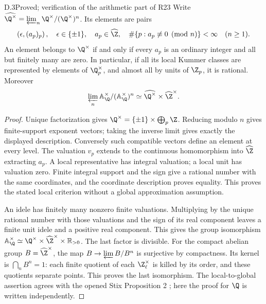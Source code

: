 \begin{claim}{D.3}{Proved; verification of the arithmetic part of R23}
Write $\widehat{\Q^\times}=\varprojlim_n\Q^\times/(\Q^\times)^n$.
Its elements are pairs
\[
 \left(\epsilon,(a_p)_p\right),\quad
 \epsilon\in\{\pm1\},\quad a_p\in\widehat{\Z},
 \quad\#\{p:a_p\not\equiv0\pmod n\}<\infty\quad(n\geq1).
\]
An element belongs to $\Q^\times$ if and only if every $a_p$ is an
ordinary integer and all but finitely many are zero. In particular,
if all its local Kummer classes are represented by elements of
$\Q_p^\times$, and almost all by units of $\Z_p$, it is rational.
Moreover
\[
 \varprojlim_n\mathbb A_\Q^\times/(\mathbb A_\Q^\times)^n
       \simeq\widehat{\Q^\times}\times\widehat{\Z}^{\times}.
\]
\end{claim}
\begin{proof}
Unique factorization gives
$\Q^\times=\{\pm1\}\times\bigoplus_p\Z$.
Reducing modulo $n$ gives finite-support exponent vectors; taking
the inverse limit gives exactly the displayed description. Conversely
such compatible vectors define an element at every level. The
valuation $v_p$ extends to the continuous homomorphism into
$\widehat\Z$ extracting $a_p$. A local representative has integral
valuation; a local unit has valuation zero. Finite integral support
and the sign give a rational number with the same coordinates, and
the coordinate description proves equality. This proves the stated
local criterion without a global approximation assumption.

An idele has finitely many nonzero finite valuations. Multiplying
by the unique rational number with those valuations and the sign of
its real component leaves a finite unit idele and a positive real
component. This gives the group isomorphism
$\mathbb A_\Q^\times\simeq
\Q^\times\times\widehat\Z^\times\times\mathbb R_{>0}$.
The last factor is divisible. For the compact abelian group
$B=\widehat\Z^\times$, the map $B\to\varprojlim B/B^n$ is
surjective by compactness. Its kernel is $\bigcap_n B^n=1$:
each finite quotient of each $\Z_\ell^\times$ is killed by its
order, and these quotients separate points. This proves the last
isomorphism. The local-to-global assertion agrees with the opened
Stix Proposition 2 \citep{D_Stix2015}; here the proof for $\Q$ is
written independently.
\end{proof}

